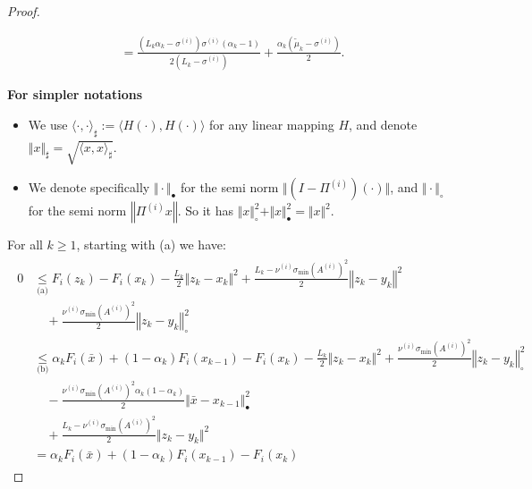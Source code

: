 \documentclass[12pt]{article}
\begin{document}
\begin{proof}
\begin{itemize}
\begin{align*}
                = 
                \frac{
                \left(L_k \alpha_k - \sigma^{(i)}\right)\sigma^{(i)}
                \left(\alpha_k - 1\right)
                }
                {2(L_k - \sigma^{(i)})}
                + \frac{\alpha_k(\tilde \mu_k - \sigma^{(i)})}{2}. 
            \end{align*}
        \end{itemize}
        \textbf{For simpler notations}
        \begin{itemize}[nosep]
            \item We use $\langle \cdot,\cdot\rangle_\sharp := \langle H(\cdot), H(\cdot)\rangle$ for any linear mapping $H$, and denote $\Vert x\Vert_{\sharp} = \sqrt{\langle x, x\rangle_\sharp}$. 
            \item We denote specifically $\Vert \cdot\Vert_\bullet$ for the semi norm $\Vert (I - \Pi^{(i)})(\cdot)\Vert$, and $\Vert \cdot\Vert_{\circ}$ for the semi norm $\left\Vert \Pi^{(i)} x\right\Vert$. So it has $\Vert x\Vert^2_\circ + \Vert x\Vert^2_\bullet = \Vert x\Vert^2$. 
        \end{itemize}
        For all $k \ge 1$, starting with (a) we have: 
        \begin{align}\label{ineq:snapg2-one-step-s1-chain1}
            \begin{split}
                0 &\underset{\text{(a)}}{\le} F_i(z_k) - F_i(x_k) - 
                \frac{L_k}{2}\Vert z_k - x_k\Vert^2 
                + \frac{L_k - \nu^{(i)}\sigma_{\min}(A^{(i)})^2}{2}\left\Vert z_k - y_k\right\Vert^2
                    \\ &\quad 
                    + \frac{\nu^{(i)}\sigma_{\min}(A^{(i)})^2}{2}\left\Vert z_k - y_k\right\Vert^2_\circ
                \\
                &\underset{\text{(b)}}{\le}
                \alpha_k F_i(\bar x) + (1 - \alpha_k)F_i(x_{k - 1}) - F_i(x_k)     
                - \frac{L_k}{2}\Vert z_k - x_k\Vert^2 
                + \frac{\nu^{(i)}\sigma_{\min}(A^{(i)})^2}{2}\left\Vert z_k - y_k\right\Vert^2_\circ
                    \\&\quad 
                    - \frac{\nu^{(i)}\sigma_{\min}(A^{(i)})^2\alpha_k(1 - \alpha_k)}{2}\Vert \bar x - x_{k - 1}\Vert^2_\bullet
                    \\&\quad
                    + \frac{L_k - \nu^{(i)}\sigma_{\min}(A^{(i)})^2}{2}\Vert z_k - y_k\Vert^2
                \\
                & = 
                \alpha_k F_i(\bar x) + (1 - \alpha_k)F_i(x_{k - 1}) - F_i(x_k)     

\end{split}
\end{align}
\end{proof}
\end{document}
